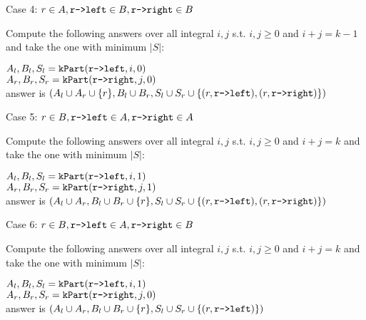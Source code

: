 \documentclass[11pt]{article}
\begin{document}
\begin{indentmore}
\begin{indentmore}
\begin{indentmore}
          Case 4: $r \in A, \texttt{r->left} \in B, \texttt{r->right} \in B$
              \begin{indentmore}
              Compute the following answers over all integral $i,j$  s.t. $i,j \geq 0$ and $i+j = k-1$ and take the one with minimum $|S|$:
                \begin{indentmore}
                $A_l, B_l, S_l = \mathtt{kPart}(\texttt{r->left},i,0)$\\
                $A_r, B_r, S_r = \mathtt{kPart}(\texttt{r->right},j,0)$\\
                answer is $(A_l \cup A_r \cup \{r\},B_l \cup B_r,S_l \cup S_r \cup \{(r, \texttt{r->left}),(r, \texttt{r->right})\})$
                \end{indentmore}
              \end{indentmore}

          Case 5: $r \in B, \texttt{r->left} \in A, \texttt{r->right} \in A$
              \begin{indentmore}
              Compute the following answers over all integral $i,j$  s.t. $i,j \geq 0$ and $i+j = k$ and take the one with minimum $|S|$:
                \begin{indentmore}
                $A_l, B_l, S_l = \mathtt{kPart}(\texttt{r->left},i,1)$\\
                $A_r, B_r, S_r = \mathtt{kPart}(\texttt{r->right},j,1)$\\
                answer is $(A_l \cup A_r,B_l \cup B_r \cup \{r\},S_l \cup S_r \cup \{(r, \texttt{r->left}),(r, \texttt{r->right})\})$
                \end{indentmore}
              \end{indentmore}

          Case 6: $r \in B, \texttt{r->left} \in A, \texttt{r->right} \in B$
              \begin{indentmore}
              Compute the following answers over all integral $i,j$  s.t. $i,j \geq 0$ and $i+j = k$ and take the one with minimum $|S|$:
                \begin{indentmore}
                $A_l, B_l, S_l = \mathtt{kPart}(\texttt{r->left},i,1)$\\
                $A_r, B_r, S_r = \mathtt{kPart}(\texttt{r->right},j,0)$\\
                answer is $(A_l \cup A_r,B_l \cup B_r \cup \{r\},S_l \cup S_r \cup \{(r, \texttt{r->left})\})$
                \end{indentmore}
              \end{indentmore}


\end{indentmore}
\end{indentmore}
\end{indentmore}
\end{document}
